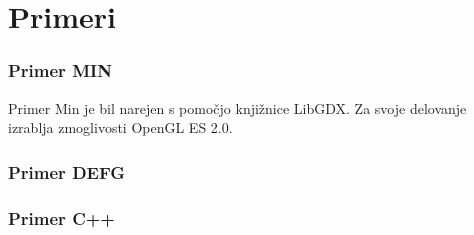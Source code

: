 \chapter{Primeri}

\subsection{Primer MIN}

Primer Min je bil narejen s pomočjo knjižnice LibGDX. Za svoje delovanje izrablja zmoglivosti OpenGL ES 2.0. 

\subsection{Primer DEFG} 



\subsection{Primer C++}


